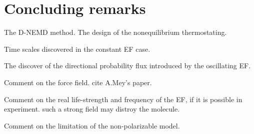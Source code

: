 \documentclass[a4paper,preprint,unsortedaddress,onecolumn]{revtex4-1}
\begin{document}





\section{Concluding remarks}

The D-NEMD method. The design of the nonequilibrium thermostating.

Time scales discovered in the constant EF case.

The discover of the directional probability flux introduced by the
oscillating EF.

Comment on the force field. cite A.Mey's paper.

Comment on the real life-strength and frequency of the EF, if it is
possible in experiment. such a strong field may distroy the molecule.

Comment on the limitation of the non-polarizable model. 

\end{document}
